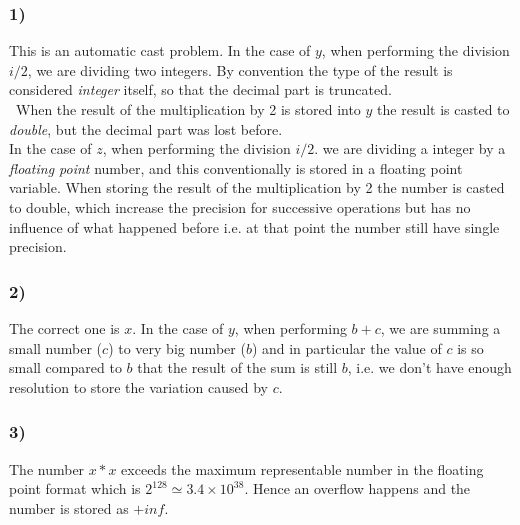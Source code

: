 \documentclass{article}
\begin{document}
\subsubsection*{1)}
This is an automatic cast problem. In the case of $y$, when performing the division $i/2$, we are dividing two integers. By convention the type of the result is considered \emph{integer} itself, so that the decimal part is truncated. \\\
When the result of the multiplication by 2 is stored into $y$ the result is casted to \emph{double}, but the decimal part was lost before. \\
In the case of $z$, when performing the division $i/2.$ we are dividing a integer by a \emph{floating point} number, and this conventionally is stored in a floating point variable. When storing the result of the multiplication by 2 
the number is casted to double, which increase the precision for successive operations but has no influence of what happened before i.e. at that point the number still have single precision.
\subsubsection*{2)}
The correct one is $x$. In the case of $y$, when performing $b+c$, we are summing a small number ($c$) to very big number ($b$) and in particular the value of $c$ is so small compared to $b$ that the result of the sum is still $b$, i.e. we don't have enough resolution to store the variation caused by $c$.
\subsubsection*{3)}
The number $x*x$ exceeds the maximum representable number in the floating point format which is $2^{128} \simeq 3.4 \times 10^{38}$. Hence an overflow happens and the number is stored as $+inf$.

\newpage 
\end{document}
